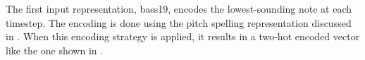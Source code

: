 
The first input representation, \gls{bass19}, encodes the
lowest-sounding note at each timestep. The encoding is done
using the pitch spelling representation discussed in
. When this encoding
strategy is applied, it results in a two-hot encoded vector
like the one shown in .

